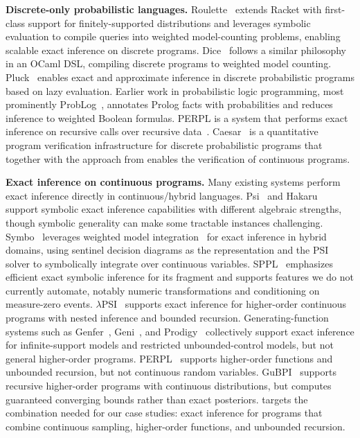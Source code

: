 \smallskip
\noindent\textbf{Discrete-only probabilistic languages.}
Roulette~\cite{Moy2025Roulette} extends Racket with first-class support for finitely-supported distributions and leverages symbolic evaluation to compile queries into weighted model-counting problems, enabling scalable exact inference on discrete programs. Dice~\cite{Holtzen2020Dice} follows a similar philosophy in an OCaml DSL, compiling discrete programs to weighted model counting. %
Pluck~\cite{Bowers2025StochasticLazyKnowledgeCompilation} enables exact and approximate inference in discrete probabilistic programs based on lazy evaluation. Earlier work in probabilistic logic programming, most prominently ProbLog~\cite{DeRaedt2007ProbLog}, annotates Prolog facts with probabilities and reduces inference to weighted Boolean formulas. PERPL is a system that performs exact inference on recursive calls over recursive data~\cite{Chiang2023PERPL}. Caesar~\cite{Schroer2023DeductiveVerificationInfrastructure} is a quantitative program verification infrastructure for discrete probabilistic programs that together with the approach from \cite{Batz2025FoundationsDeductiveVerification} enables the verification of continuous programs. 

\smallskip
\noindent\textbf{Exact inference on continuous programs.} 
Many existing systems perform exact inference directly in continuous/hybrid languages. Psi~\cite{gehr2016psi} and Hakaru~\cite{Narayanan2016Hakaru} support symbolic exact inference capabilities with different algebraic strengths, though symbolic generality can make some tractable instances challenging. Symbo~\cite{Martires2019ExactApproxWMI} leverages weighted model integration~\cite{Belle2015ProbabilisticInferenceHybridWMI} for exact inference in hybrid domains, using sentinel decision diagrams as the representation and the PSI solver to symbolically integrate over continuous variables. SPPL~\cite{Saad2021SPPL} emphasizes efficient exact symbolic inference for its fragment and supports features we do not currently automate, notably numeric transformations and conditioning on measure-zero events. $\lambda$PSI~\cite{Gehr2020LambdaPSI} supports exact inference for higher-order continuous programs with nested inference and bounded recursion. Generating-function systems such as Genfer~\cite{Zaiser2023Genfer}, Geni~\cite{Li2025Geni}, and Prodigy~\cite{Klinkenberg2024Prodigy} collectively support exact inference for infinite-support models and restricted unbounded-control models, but not general higher-order programs. PERPL~\cite{Chiang2023PERPL} supports higher-order functions and unbounded recursion, but not continuous random variables. GuBPI~\cite{Beutner2022GuaranteedBounds} supports recursive higher-order programs with continuous distributions, but computes guaranteed converging bounds rather than exact posteriors. \Slice{} targets the combination needed for our case studies: exact inference for programs that combine continuous sampling, higher-order functions, and unbounded recursion.

